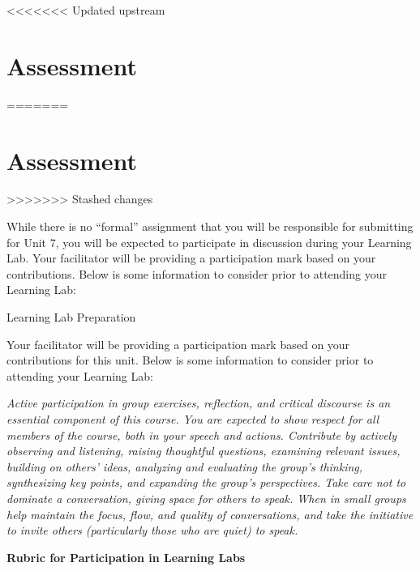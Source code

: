 \documentclass[
]{book}
\begin{document}
<<<<<<< Updated upstream
\hypertarget{assessment-6}{%
\section*{Assessment}\label{assessment-6}}
=======
\hypertarget{assessment-5}{%
\section*{Assessment}\label{assessment-5}}
>>>>>>> Stashed changes

\begin{assessment}
While there is no ``formal'' assignment that you will be responsible for submitting for Unit 7, you will be expected to participate in discussion during your Learning Lab. Your facilitator will be providing a participation mark based on your contributions. Below is some information to consider prior to attending your Learning Lab:

{Learning Lab Preparation}

Your facilitator will be providing a participation mark based on your contributions for this unit. Below is some information to consider prior to attending your Learning Lab:

\emph{Active participation in group exercises, reflection, and critical discourse is an essential component of this course. You are expected to show respect for all members of the course, both in your speech and actions. Contribute by actively observing and listening, raising thoughtful questions, examining relevant issues, building on others' ideas, analyzing and evaluating the group's thinking, synthesizing key points, and expanding the group's perspectives. Take care not to dominate a conversation, giving space for others to speak. When in small groups help maintain the focus, flow, and quality of conversations, and take the initiative to invite others (particularly those who are quiet) to speak.}

\textbf{Rubric for Participation in Learning Labs}


\end{assessment}
\end{document}
